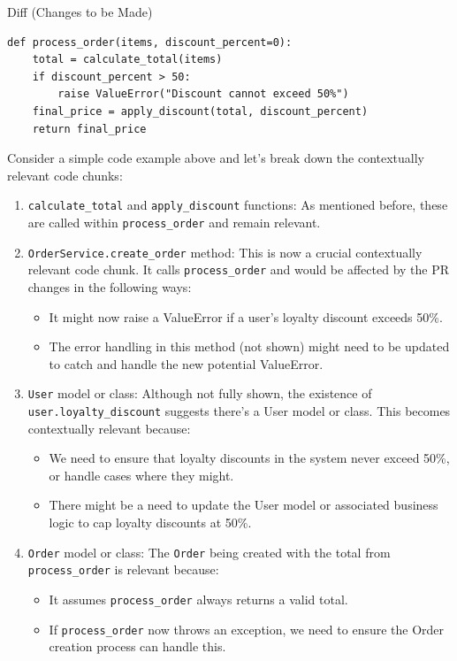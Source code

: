 Diff (Changes to be Made)

\begin{lstlisting}[escapechar=|]
def process_order(items, discount_percent=0):
    total = calculate_total(items)
    if discount_percent > 50:
        raise ValueError("Discount cannot exceed 50%")
    final_price = apply_discount(total, discount_percent)
    return final_price
\end{lstlisting}

Consider a simple code example above and let's break down the contextually relevant code chunks:

\begin{enumerate}
    \item \texttt{calculate\_total} and \texttt{apply\_discount} functions: As mentioned before, these are called within \texttt{process\_order} and remain relevant.
    \item \texttt{OrderService.create\_order} method: This is now a crucial contextually relevant code chunk. It calls \texttt{process\_order} and would be affected by the PR changes in the following ways:
    \begin{itemize}
        \item It might now raise a ValueError if a user's loyalty discount exceeds 50\%.
        \item The error handling in this method (not shown) might need to be updated to catch and handle the new potential ValueError.
    \end{itemize}
    \item \texttt{User} model or class: Although not fully shown, the existence of \texttt{user.loyalty\_discount} suggests there's a User model or class. This becomes contextually relevant because:
    \begin{itemize}
        \item We need to ensure that loyalty discounts in the system never exceed 50\%, or handle cases where they might.
        \item There might be a need to update the User model or associated business logic to cap loyalty discounts at 50\%.
    \end{itemize}
    \item \texttt{Order} model or class: The \texttt{Order} being created with the total from \texttt{process\_order} is relevant because:
    \begin{itemize}
        \item It assumes \texttt{process\_order} always returns a valid total.
        \item If \texttt{process\_order} now throws an exception, we need to ensure the Order creation process can handle this.
    \end{itemize}
\end{enumerate}

